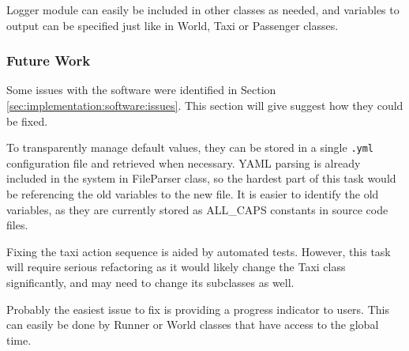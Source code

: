 Logger module can easily be included in other classes as needed, and variables
to output can be specified just like in World, Taxi or Passenger classes.


\subsubsection{Future Work}

Some issues with the software were identified in Section
\ref{sec:implementation:software:issues}. This section will give suggest how
they could be fixed.

To transparently manage default values, they can be stored in a single
\texttt{.yml} configuration file and retrieved when necessary. YAML parsing is
already included in the system in FileParser class, so the hardest part of this
task would be referencing the old variables to the new file. It is easier to
identify the old variables, as they are currently stored as ALL\_CAPS constants
in source code files.

Fixing the taxi action sequence is aided by automated tests. However, this task
will require serious refactoring as it would likely change the Taxi class
significantly, and may need to change its subclasses as well.

Probably the easiest issue to fix is providing a progress indicator to users.
This can easily be done by Runner or World classes that have access to the
global time.
